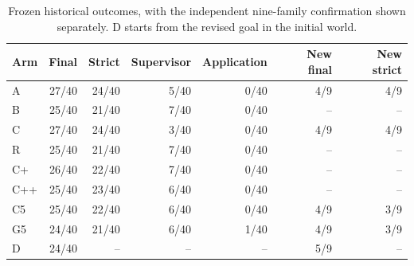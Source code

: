 \begin{table}[t]
\centering
\caption{Frozen historical outcomes, with the independent nine-family confirmation shown separately. D starts from the revised goal in the initial world.}
\label{tab:history}
\small
\begin{tabular}{lrrrrrr}
\toprule
Arm & Final & Strict & Supervisor & Application & New final & New strict \\
\midrule
A & 27/40 & 24/40 & 5/40 & 0/40 & 4/9 & 4/9 \\
B & 25/40 & 21/40 & 7/40 & 0/40 & -- & -- \\
C & 27/40 & 24/40 & 3/40 & 0/40 & 4/9 & 4/9 \\
R & 25/40 & 21/40 & 7/40 & 0/40 & -- & -- \\
C+ & 26/40 & 22/40 & 7/40 & 0/40 & -- & -- \\
C++ & 25/40 & 23/40 & 6/40 & 0/40 & -- & -- \\
C5 & 25/40 & 22/40 & 6/40 & 0/40 & 4/9 & 3/9 \\
G5 & 24/40 & 21/40 & 6/40 & 1/40 & 4/9 & 3/9 \\
D & 24/40 & -- & -- & -- & 5/9 & -- \\
\bottomrule
\end{tabular}
\end{table}
